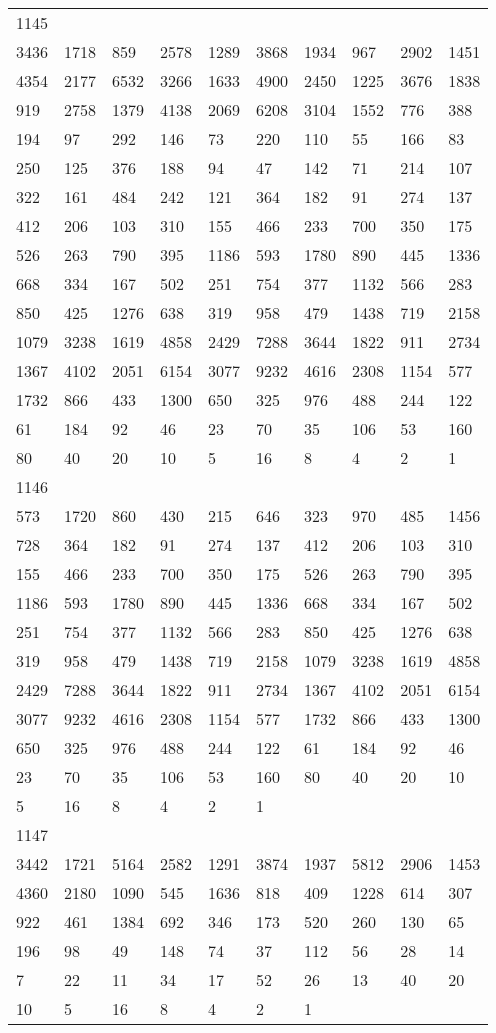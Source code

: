 \begin{longtable}{*{10}{l}}
1145&&&&&&&&&\\
3436& 1718& 859& 2578& 1289& 3868& 1934& 967& 2902& 1451\\
4354& 2177& 6532& 3266& 1633& 4900& 2450& 1225& 3676& 1838\\
919& 2758& 1379& 4138& 2069& 6208& 3104& 1552& 776& 388\\
194& 97& 292& 146& 73& 220& 110& 55& 166& 83\\
250& 125& 376& 188& 94& 47& 142& 71& 214& 107\\
322& 161& 484& 242& 121& 364& 182& 91& 274& 137\\
412& 206& 103& 310& 155& 466& 233& 700& 350& 175\\
526& 263& 790& 395& 1186& 593& 1780& 890& 445& 1336\\
668& 334& 167& 502& 251& 754& 377& 1132& 566& 283\\
850& 425& 1276& 638& 319& 958& 479& 1438& 719& 2158\\
1079& 3238& 1619& 4858& 2429& 7288& 3644& 1822& 911& 2734\\
1367& 4102& 2051& 6154& 3077& 9232& 4616& 2308& 1154& 577\\
1732& 866& 433& 1300& 650& 325& 976& 488& 244& 122\\
61& 184& 92& 46& 23& 70& 35& 106& 53& 160\\
80& 40& 20& 10& 5& 16& 8& 4& 2& 1\\

1146&&&&&&&&&\\
573& 1720& 860& 430& 215& 646& 323& 970& 485& 1456\\
728& 364& 182& 91& 274& 137& 412& 206& 103& 310\\
155& 466& 233& 700& 350& 175& 526& 263& 790& 395\\
1186& 593& 1780& 890& 445& 1336& 668& 334& 167& 502\\
251& 754& 377& 1132& 566& 283& 850& 425& 1276& 638\\
319& 958& 479& 1438& 719& 2158& 1079& 3238& 1619& 4858\\
2429& 7288& 3644& 1822& 911& 2734& 1367& 4102& 2051& 6154\\
3077& 9232& 4616& 2308& 1154& 577& 1732& 866& 433& 1300\\
650& 325& 976& 488& 244& 122& 61& 184& 92& 46\\
23& 70& 35& 106& 53& 160& 80& 40& 20& 10\\
5& 16& 8& 4& 2& 1& \\

1147&&&&&&&&&\\
3442& 1721& 5164& 2582& 1291& 3874& 1937& 5812& 2906& 1453\\
4360& 2180& 1090& 545& 1636& 818& 409& 1228& 614& 307\\
922& 461& 1384& 692& 346& 173& 520& 260& 130& 65\\
196& 98& 49& 148& 74& 37& 112& 56& 28& 14\\
7& 22& 11& 34& 17& 52& 26& 13& 40& 20\\
10& 5& 16& 8& 4& 2& 1& \\


\end{longtable}
